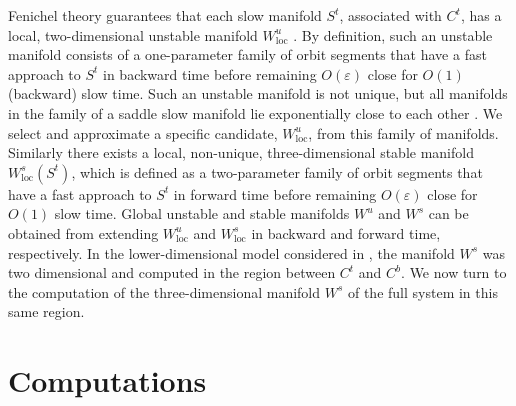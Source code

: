 \documentclass{ws-ijbc}
\begin{document}
Fenichel theory guarantees that each slow manifold $S^t$, associated with $C^t$, has a local, two-dimensional unstable manifold $W_{\mathrm{loc}}^u$ \cite{Fenichel}.  By definition, such an unstable manifold consists of a one-parameter family of orbit segments that have a fast approach to $S^t$ in backward time before remaining $O(\varepsilon)$ close for $O(1)$ (backward) slow time.  Such an unstable manifold is not unique, but all manifolds in the family of a saddle slow manifold lie exponentially close to each other \cite{Fenichel}.  We select and approximate a specific candidate, $W_{\mathrm{loc}}^u$, from this family of manifolds.  Similarly there exists a local, non-unique, three-dimensional stable manifold $W^s_{\mathrm{loc}}(S^t)$, which is defined as a two-parameter family of orbit segments that have a fast approach to $S^t$ in forward time before remaining $O(\varepsilon)$ close for $O(1)$ slow time.  Global unstable and stable manifolds $W^u$ and $W^s$ can be obtained from extending $W^u_{\mathrm{loc}}$ and $W^s_{\mathrm{loc}}$ in backward and forward time, respectively.  In the lower-dimensional model considered in \cite{QSSA}, the manifold $W^s$ was two dimensional and computed in the region between $C^t$ and $C^b$.  We now turn to the computation of the three-dimensional manifold $W^s$ of the full system in this same region.

\section{Computations}
    
\end{document}

